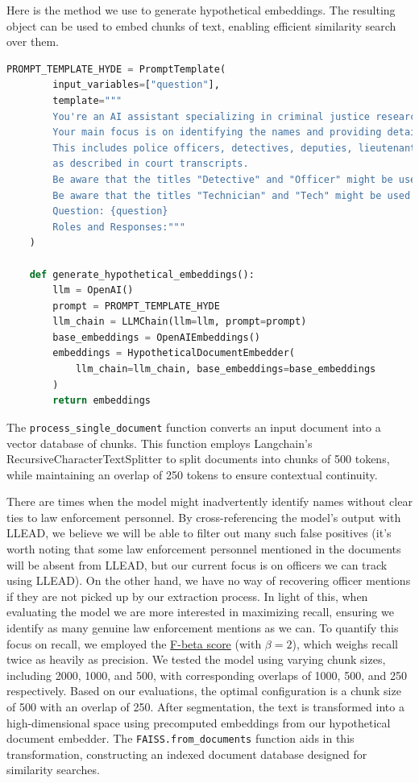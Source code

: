 \documentclass{article}
\begin{document}
Here is the method we use to generate hypothetical embeddings. The resulting object can be used to embed chunks of text, enabling efficient similarity search over them.

\begin{lstlisting}[language=Python, caption=Code Snippet 2, breaklines=true]
    PROMPT_TEMPLATE_HYDE = PromptTemplate(
        input_variables=["question"],
        template="""
        You're an AI assistant specializing in criminal justice research. 
        Your main focus is on identifying the names and providing detailed context of mention for each law enforcement personnel. 
        This includes police officers, detectives, deputies, lieutenants, sergeants, captains, technicians, coroners, investigators, patrolmen, and criminalists, 
        as described in court transcripts.
        Be aware that the titles "Detective" and "Officer" might be used interchangeably.
        Be aware that the titles "Technician" and "Tech" might be used interchangeably.
        Question: {question}
        Roles and Responses:"""
    )
    
    def generate_hypothetical_embeddings():
        llm = OpenAI()
        prompt = PROMPT_TEMPLATE_HYDE
        llm_chain = LLMChain(llm=llm, prompt=prompt)
        base_embeddings = OpenAIEmbeddings()
        embeddings = HypotheticalDocumentEmbedder(
            llm_chain=llm_chain, base_embeddings=base_embeddings
        )
        return embeddings
\end{lstlisting}


The \texttt{process\_single\_document} function converts an input document into a vector database of chunks. This function employs Langchain's RecursiveCharacterTextSplitter to split documents into chunks of 500 tokens, while maintaining an overlap of 250 tokens to ensure contextual continuity.

There are times when the model might inadvertently identify names without clear ties to law enforcement personnel. By cross-referencing the model's output with LLEAD, we believe we will be able to filter out many such false positives (it's worth noting that some law enforcement personnel mentioned in the documents will be absent from LLEAD, but our current focus is on officers we can track using LLEAD). On the other hand, we have no way of recovering officer mentions if they are not picked up by our extraction process. In light of this, when evaluating the model we are more interested in maximizing recall, ensuring we identify as many genuine law enforcement mentions as we can.  To quantify this focus on recall, we employed the \href{https://en.wikipedia.org/wiki/F-score#F%CE%B2\_score}{F-beta score} (with $\beta=2$), which weighs recall twice as heavily as precision. We tested the model using varying chunk sizes, including 2000, 1000, and 500, with corresponding overlaps of 1000, 500, and 250 respectively. Based on our evaluations, the optimal configuration is a chunk size of 500 with an overlap of 250. After segmentation, the text is transformed into a high-dimensional space using precomputed embeddings from our hypothetical document embedder. The \texttt{FAISS.from\_documents} function aids in this transformation, constructing an indexed document database designed for similarity searches.
\end{document}
